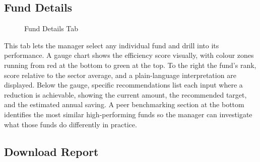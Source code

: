 \documentclass[12pt,a4paper]{report}
\begin{document}
\subsection{Fund Details}

\begin{figure}[H]
\centering
{}
\caption{Fund Details Tab}
\label{fig:fund_details}
\end{figure}

This tab lets the manager select any individual fund and drill into its performance. A
gauge chart shows the efficiency score visually, with colour zones running from red at the
bottom to green at the top. To the right the fund's rank, score relative to the sector
average, and a plain-language interpretation are displayed. Below the gauge, specific
recommendations list each input where a reduction is achievable, showing the current
amount, the recommended target, and the estimated annual saving. A peer benchmarking
section at the bottom identifies the most similar high-performing funds so the manager can
investigate what those funds do differently in practice.

\subsection{Download Report}
\end{document}
